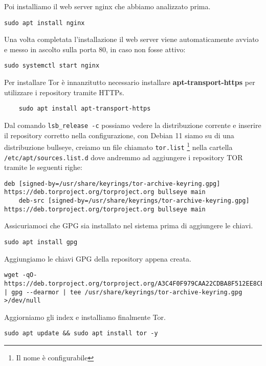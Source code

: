 Poi installiamo il web server nginx che abbiamo analizzato prima.
\begin{lstlisting}[caption={Installazione Nginx}]
    sudo apt install nginx
\end{lstlisting}

Una volta completata l'installazione il web server viene automaticamente avviato e messo in ascolto sulla porta 80, in caso non fosse attivo: \\
\begin{lstlisting}[caption={Avvio di Nginx}]
    sudo systemctl start nginx
\end{lstlisting}

Per installare Tor è innanzitutto necessario installare \textbf{apt-transport-https} per utilizzare i repository tramite HTTPs.
\begin{lstlisting}
    sudo apt install apt-transport-https
\end{lstlisting}
Dal comando \lstinline{lsb_release -c} possiamo vedere la distribuzione corrente e inserire il repository corretto nella configurazione, con Debian 11 siamo su di una distribuzione bullseye, creiamo un file chiamato \lstinline{tor.list} \footnote{Il nome è configurabile} nella cartella \lstinline{/etc/apt/sources.list.d} dove andremmo ad aggiungere i repository TOR tramite le seguenti righe:
\begin{lstlisting}[caption={Tor Repository}]
    deb [signed-by=/usr/share/keyrings/tor-archive-keyring.gpg] https://deb.torproject.org/torproject.org bullseye main
    deb-src [signed-by=/usr/share/keyrings/tor-archive-keyring.gpg] https://deb.torproject.org/torproject.org bullseye main
\end{lstlisting}

Assicuriamoci che GPG sia installato nel sistema prima di aggiungere le chiavi.
\begin{lstlisting}[caption={Installazione GPG}]
    sudo apt install gpg
\end{lstlisting}

Aggiungiamo le chiavi GPG della repository appena creata.
\begin{lstlisting}[caption={Aggiunta chiavi gpg dal repository Tor}]
    wget -qO- https://deb.torproject.org/torproject.org/A3C4F0F979CAA22CDBA8F512EE8CBC9E886DDD89.asc | gpg --dearmor | tee /usr/share/keyrings/tor-archive-keyring.gpg >/dev/null
\end{lstlisting}

Aggiorniamo gli index e installiamo finalmente Tor.
\begin{lstlisting}[caption={Installazione Tor}]
    sudo apt update && sudo apt install tor -y 
\end{lstlisting}

